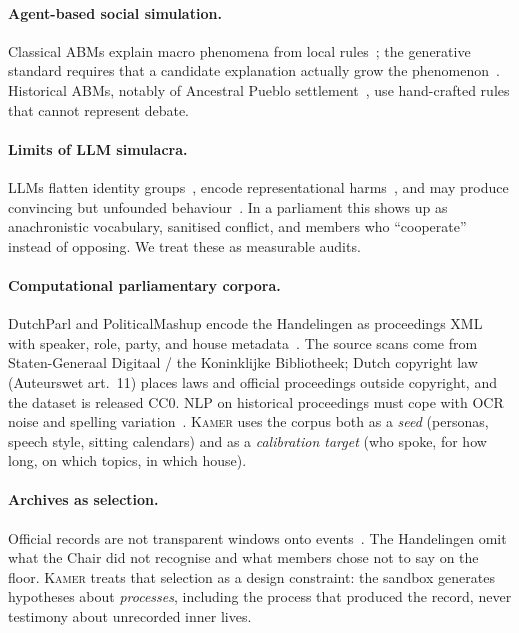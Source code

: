 \documentclass[sigconf,review,anonymous]{acmart}
\newcommand{\sys}{\textsc{Kamer}}
\begin{document}
\paragraph{Agent-based social simulation.} Classical ABMs explain macro
phenomena from local rules~\cite{schelling1971dynamic,epstein1996growing};
the generative standard requires that a candidate explanation actually grow
the phenomenon~\cite{epstein2006generative}. Historical ABMs, notably of
Ancestral Pueblo settlement~\cite{axtell2002population}, use hand-crafted
rules that cannot represent debate.

\paragraph{Limits of LLM simulacra.} LLMs flatten identity
groups~\cite{wang2025identity}, encode representational
harms~\cite{bender2021parrots}, and may produce convincing but unfounded
behaviour~\cite{ziems2024css}. In a parliament this shows up as anachronistic
vocabulary, sanitised conflict, and members who ``cooperate'' instead of
opposing. We treat these as measurable audits.

\paragraph{Computational parliamentary corpora.} DutchParl and PoliticalMashup
encode the Handelingen as proceedings XML with speaker, role, party, and
house metadata~\cite{marx2010dutchparl,marx2012dutchparl}. The source scans
come from Staten-Generaal Digitaal / the Koninklijke Bibliotheek; Dutch
copyright law (Auteurswet art.~11) places laws and official proceedings
outside copyright, and the dataset is released CC0. NLP on historical
proceedings must cope with OCR noise and spelling variation~\cite{ehrmann2023ner}.
\sys{} uses the corpus both as a \emph{seed} (personas, speech style, sitting
calendars) and as a \emph{calibration target} (who spoke, for how long, on
which topics, in which house).

\paragraph{Archives as selection.} Official records are not transparent
windows onto events~\cite{trouillot1995silencing}. The Handelingen omit
what the Chair did not recognise and what members chose not to say on the
floor. \sys{} treats that selection as a design constraint: the sandbox
generates hypotheses about \emph{processes}, including the process that
produced the record, never testimony about unrecorded inner lives.
\end{document}
